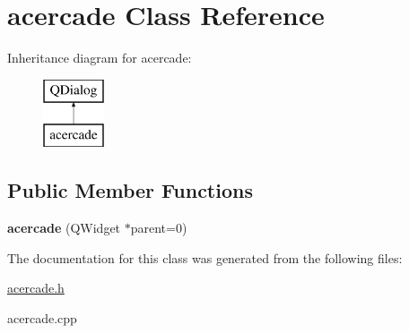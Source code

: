 \hypertarget{classacercade}{\section{acercade Class Reference}
\label{classacercade}
}
Inheritance diagram for acercade\-:\begin{figure}[H]
\begin{center}
\leavevmode
\includegraphics[height=2.000000cm]{classacercade}
\end{center}
\end{figure}
\subsection*{Public Member Functions}
\begin{DoxyCompactItemize}
\item 
\hypertarget{classacercade_abc0954c76a298550883117ede795f268}{{\bfseries acercade} (Q\-Widget $\ast$parent=0)}\label{classacercade_abc0954c76a298550883117ede795f268}

\end{DoxyCompactItemize}


The documentation for this class was generated from the following files\-:\begin{DoxyCompactItemize}
\item 
\hyperlink{acercade_8h}{acercade.\-h}\item 
acercade.\-cpp\end{DoxyCompactItemize}
